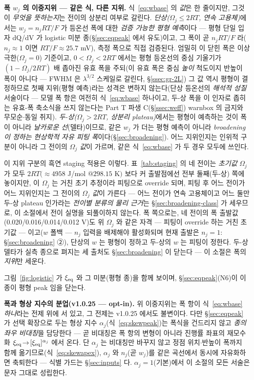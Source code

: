 \textbf{폭 $w_j$ 의 이중지위 --- 같은 식, 다른 지위.} 식~\eqref{eq:wbase} 의 \emph{값}은 한 줄이지만, 그것이
\emph{무엇을 뜻하는지}는 전이의 상분리 여부로 갈린다. \emph{단상($\Omega_j\le2RT$, 연속 고용체)}에서는 $w_j=n_jRT/F$
가 등온선 폭에 대한 \emph{검증 가능한 평형 예측}이다 --- 평형 단일 입자 dQ/dV 가 logistic
미분 종(\S\ref{sec:eqpeak} 에서 유도)이고, 그 폭이 곧 $n_jRT/F$ 라($n_j\!\approx\!1$ 이면 $RT/F\!\approx\!25.7$ mV), 측정 폭으로 직접 검증된다. 엄밀히 이 닫힌 폭은 이상 극한($\Omega_j=0$) 기준이고,
$0<\Omega_j<2RT$ 에서는 평형 등온선의 중심 기울기가 $(1-\Omega_j/2RT)$ 배 좁아진 유효 폭을 주되(이 유효
폭은 중심 \emph{높이} 척도이지 반높이 폭이 아니다 --- FWHM 은 $\lambda^{3/2}$ 스케일로 갈린다, \S\ref{ssec:gr-2L}) 그
값 역시 평형이 결정하므로 첫째 지위(평형 예측)라는 성격은 변하지 않는다(단상 등온선의 \emph{해석적 성질}
서술이다 --- 모델 폭 항은 여전히 식~\eqref{eq:wbase} 하나이고, 두-상 폭을 이 인자로 좁히는 유효-폭
축소식을 쓰지 않는다는 Part T 파생 C(\S\ref{ssec:weff}) warnbox 의 금지와 무모순$\cdot$동일 취지).
\emph{두-상($\Omega_j>2RT$, 상분리 plateau)}에서는 평형이 예측하는 것이 폭이 아니라 \emph{날카로운 선}(델타)이므로,
같은 $w_j$ 가 더는 평형 예측이 아니라 \emph{broadening 이 정하는 현상학적 자유 피팅 폭}이다(\S\ref{sec:broadening}).
어느 지위인지는 인위적 구분이 아니라 그 전이의 \emph{$\Omega_j$ 값}이 가르며, 같은 식~\eqref{eq:wbase} 가 두 경우 모두에
쓰인다.

이 지위 구분의 흑연 staging 적용은 이렇다. 표~\ref{tab:staging} 의 네 전이는 \emph{초기값} $\Omega_j$ 가 모두 $2RT(\!\approx\!4958$ J/mol
$@298.15$ K$)$ 보다 커 출발점에선 전부 둘째(두-상) 쪽에 놓이지만, 이 $\Omega_j$ 는 거친 초기 추정이라 피팅으로
override 되며, 피팅 후 어느 전이가 어느 지위인지는 그 전이의 \emph{$\Omega_j$ 값}이 가른다 --- 어느 전이가
연속 고용체이고 어느 둘만 두-상 plateau 인가라는 \emph{전이별 분류의 물리 근거}는 \S\ref{sec:broadening-class} 가
세우므로, 이 소절에서 전이 실명을 되풀이하지 않는다. 폭 쪽으로는, 네 전이의 폭 출발값(0.020/0.016/0.014/0.012 V)도 위 $\Omega_j$ 와 같은 자격 --- 피팅이
override 하는 거친 초기값 --- 이고($w$ 폴백 --- $n_j$ 입력을
배제해야 활성화되며 현재 출발은 $n_j{=}1$: \S\ref{sec:broadening} ②), 단상의 $w$ 는 평형이
정하고 두-상의 $w$ 는 피팅이 정한다. 두-상 델타가 실측 종으로 펴지는 세 출처도 \S\ref{sec:broadening} 이 닫는다 --- 이 소절은 폭의 \emph{지위}만 세운다.

그림~\ref{fig:logistic} 가 $\xi_{\mathrm{eq}}$ 와 그 미분(평형 종)을 함께 보이며, \S\ref{sec:eqpeak}(N6)이 이 종이 평형 peak 임을 닫는다.

\textbf{폭과 형상 지수의 분업(v1.0.25 --- opt-in).} 위 이중지위는 폭 항이 식~\eqref{eq:wbase} \emph{하나}라는
전제 위에 서 있고, 그 전제는 v1.0.25 에서도 불변이다. 다만 \S\ref{sec:eqpeak} 가 선택 확장으로 두는 형상
지수 $\alpha_j$(식~\eqref{eq:skewpeak})는 폭식을 건드리지 않고 \emph{종의 좌우 비대칭}을 담당한다 --- 곧
비대칭은 폭 항의 변형이 아니라 진행률 좌표의 재모수화 $\xi_{\mathrm{eq}}\!\to\![\xi_{\mathrm{eq}}]^{\alpha_j}$ 에서 온다.
단 $\alpha_j$ 는 비대칭만 바꾸지 않고 정점 위치$\cdot$반높이 폭까지 함께 옮기므로(식~\eqref{eq:skewapex}),
$\alpha_j$ 와 $n_j$(곧 $w_j$)를 같은 곡선에서 동시에 자유화하면 축퇴한다 --- 식별 가드는
\S\ref{sec:inputs} 다. $\alpha_j=1$(기본)에서 이 소절의 모든 서술은 문자 그대로 성립한다.

